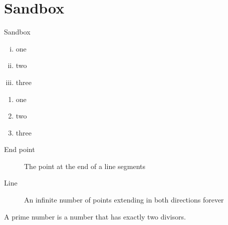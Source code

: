 \documentclass[onlytextwidth]{beamer}
\begin{document}
\section{Sandbox}
\begin{frame}{Sandbox}
  \begin{enumerate}[(i)]
    \item one
    \item two
    \item three
  \end{enumerate}


  \begin{enumerate}[T \quad F \,]
    \item one
    \item two
    \item three
  \end{enumerate}

  \begin{description}
    \item[End point] The point at the end of a line segments
    \item[Line] An infinite number of points extending in both directions forever 
  \end{description}

  \begin{definition}
    A \alert{prime number} is a number that has exactly two divisors. 
  \end{definition}
\end{frame}
\end{document}
